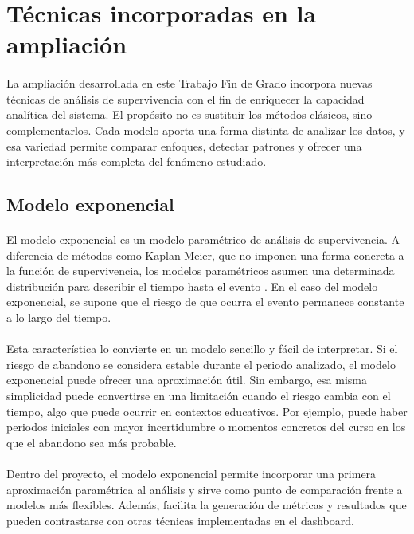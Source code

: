 \section{Técnicas incorporadas en la ampliación}
\paragraph*{}La ampliación desarrollada en este Trabajo Fin de Grado incorpora nuevas técnicas de análisis de supervivencia con el fin de enriquecer la capacidad analítica del sistema. El propósito no es sustituir los métodos clásicos, sino complementarlos. Cada modelo aporta una forma distinta de analizar los datos, y esa variedad permite comparar enfoques, detectar patrones y ofrecer una interpretación más completa del fenómeno estudiado.

\subsection{Modelo exponencial}
\paragraph*{}El modelo exponencial es un modelo paramétrico de análisis de supervivencia. A diferencia de métodos como Kaplan-Meier, que no imponen una forma concreta a la función de supervivencia, los modelos paramétricos asumen una determinada distribución para describir el tiempo hasta el evento \cite{davidsonpilon2019lifelines,jackson2016flexsurv}. En el caso del modelo exponencial, se supone que el riesgo de que ocurra el evento permanece constante a lo largo del tiempo.

\paragraph*{}Esta característica lo convierte en un modelo sencillo y fácil de interpretar. Si el riesgo de abandono se considera estable durante el periodo analizado, el modelo exponencial puede ofrecer una aproximación útil. Sin embargo, esa misma simplicidad puede convertirse en una limitación cuando el riesgo cambia con el tiempo, algo que puede ocurrir en contextos educativos. Por ejemplo, puede haber periodos iniciales con mayor incertidumbre o momentos concretos del curso en los que el abandono sea más probable.

\paragraph*{}Dentro del proyecto, el modelo exponencial permite incorporar una primera aproximación paramétrica al análisis y sirve como punto de comparación frente a modelos más flexibles. Además, facilita la generación de métricas y resultados que pueden contrastarse con otras técnicas implementadas en el dashboard.

